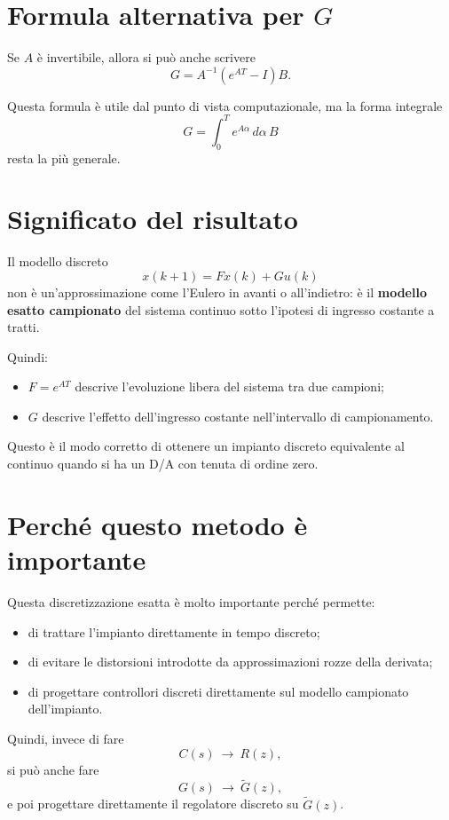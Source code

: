 \section{Formula alternativa per \(G\)}

Se \(A\) \`e invertibile, allora si pu\`o anche scrivere
\[
G=A^{-1}(e^{AT}-I)B.
\]

Questa formula \`e utile dal punto di vista computazionale,
ma la forma integrale
\[
G=\int_0^T e^{A\alpha}\,d\alpha\,B
\]
resta la pi\`u generale.

\section{Significato del risultato}

Il modello discreto
\[
x(k+1)=Fx(k)+Gu(k)
\]
non \`e un'approssimazione come l'Eulero in avanti o all'indietro:
\`e il \textbf{modello esatto campionato} del sistema continuo
sotto l'ipotesi di ingresso costante a tratti.

Quindi:
\begin{itemize}
    \item \(F=e^{AT}\) descrive l'evoluzione libera del sistema tra due campioni;
    \item \(G\) descrive l'effetto dell'ingresso costante nell'intervallo di campionamento.
\end{itemize}

Questo \`e il modo corretto di ottenere un impianto discreto equivalente al continuo
quando si ha un D/A con tenuta di ordine zero.

\section{Perch\'e questo metodo \`e importante}

Questa discretizzazione esatta \`e molto importante perch\'e permette:
\begin{itemize}
    \item di trattare l'impianto direttamente in tempo discreto;
    \item di evitare le distorsioni introdotte da approssimazioni rozze della derivata;
    \item di progettare controllori discreti direttamente sul modello campionato dell'impianto.
\end{itemize}

Quindi, invece di fare
\[
C(s)\ \longrightarrow\ R(z),
\]
si pu\`o anche fare
\[
G(s)\ \longrightarrow\ \tilde G(z),
\]
e poi progettare direttamente il regolatore discreto su \(\tilde G(z)\).

